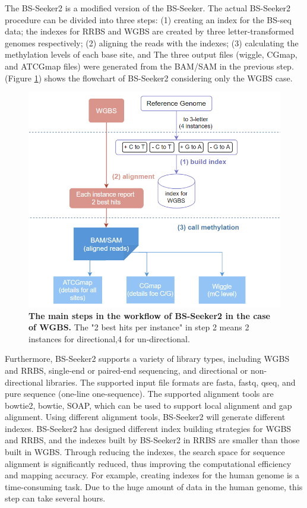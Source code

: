 \documentclass{PHlab-thesis}
\begin{document}
The BS-Seeker2 is a modified version of the BS-Seeker. The actual BS-Seeker2 procedure can be divided into three steps: (1) creating an index for the BS-seq data; the indexes for RRBS and WGBS are created by three letter-transformed genomes respectively; (2) aligning the reads with the indexes; (3) calculating the methylation levels of each base site, and The three output files (wiggle, CGmap, and ATCGmap files) were generated from the BAM/SAM in the previous step. (Figure \ref{f2}) shows the flowchart of BS-Seeker2 considering only the WGBS case\cite{guo2013bs}.

\begin{figure}[h!]
  \centering
  \includegraphics[scale=0.8]{figures/bs_seeker2_workflow.png}
  \caption{\textbf{The main steps in the workflow of BS-Seeker2 in the case of WGBS.}
  The "2 best hits per instance" in step 2 means 2 instances for directional,4 for un-directional.}
  \label{f2}
\end{figure}

Furthermore, BS-Seeker2 supports a variety of library types, including WGBS and RRBS, single-end or paired-end sequencing, and directional or non-directional libraries. The supported input file formats are fasta, fastq, qseq, and pure sequence (one-line one-sequence). The supported alignment tools are bowtie2, bowtie, SOAP, which can be used to support local alignment and gap alignment. Using different alignment tools, BS-Seeker2 will generate different indexes. BS-Seeker2 has designed different index building strategies for WGBS and RRBS, and the indexes built by BS-Seeker2 in RRBS are smaller than those built in WGBS. Through reducing the indexes, the search space for sequence alignment is significantly reduced, thus improving the computational efficiency and mapping accuracy. For example, creating indexes for the human genome is a time-consuming task. Due to the huge amount of data in the human genome, this step can take several hours.
\end{document}
